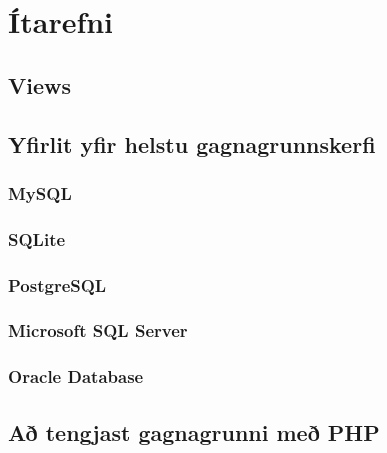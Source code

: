 \documentclass[nohyper,notoc,justified]{tufte-book}
\begin{document}
\chapter{Ítarefni}
\label{kafli:itarefni}
\section{Views}
\section{Yfirlit yfir helstu gagnagrunnskerfi}
\subsection{MySQL}
\subsection{SQLite}
\subsection{PostgreSQL}
\subsection{Microsoft SQL Server}
\subsection{Oracle Database}
\section{Að tengjast gagnagrunni með PHP}
\end{document}
